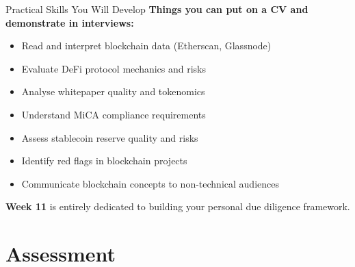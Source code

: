 \documentclass[10pt]{beamer}
\begin{document}
\begin{frame}{Practical Skills You Will Develop}
  \textbf{Things you can put on a CV and demonstrate in interviews:}
  
  \vspace{1em}
  \begin{itemize}
    \item Read and interpret blockchain data (Etherscan, Glassnode)
    
    \vspace{0.3em}
    \item Evaluate DeFi protocol mechanics and risks
    
    \vspace{0.3em}
    \item Analyse whitepaper quality and tokenomics
    
    \vspace{0.3em}
    \item Understand MiCA compliance requirements
    
    \vspace{0.3em}
    \item Assess stablecoin reserve quality and risks
    
    \vspace{0.3em}
    \item Identify red flags in blockchain projects
    
    \vspace{0.3em}
    \item Communicate blockchain concepts to non-technical audiences
  \end{itemize}
  
  \vspace{1em}
  \textbf{Week 11} is entirely dedicated to building your personal due diligence framework.
\end{frame}

\section{Assessment}
\end{document}
